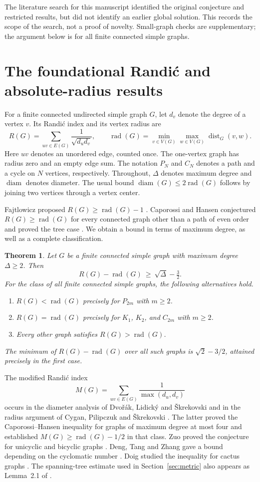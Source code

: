 \documentclass[11pt,a4paper]{article}
\newtheorem{theorem}{Theorem}[section]
\newcommand{\rad}{\operatorname{rad}}
\newcommand{\diam}{\operatorname{diam}}
\newcommand{\dist}{\operatorname{dist}}
\begin{document}
The literature search for this manuscript identified the original
conjecture and restricted results, but did not identify an earlier
global solution. This records the scope of the search, not a proof
of novelty. Small-graph checks are supplementary; the argument below
is for all finite connected simple graphs.

\section{The foundational Randi\'c and absolute-radius results}
For a finite connected undirected simple graph $G$, let $d_v$ denote the
degree of a vertex $v$. Its Randi\'c index and its vertex radius are
\[
 R(G)=\sum_{uv\in E(G)}\frac{1}{\sqrt{d_ud_v}},\qquad
 \rad(G)=\min_{v\in V(G)}\max_{w\in V(G)}\dist_G(v,w).
\]
Here $uv$ denotes an unordered edge, counted once. The one-vertex graph
has radius zero and an empty edge sum. The notation $P_N$ and $C_N$
denotes a path and a cycle on $N$ vertices, respectively. Throughout,
$\Delta$ denotes maximum degree and $\diam$ denotes diameter. The usual
bound $\diam(G)\le2\rad(G)$ follows by joining two vertices through a
vertex center.

Fajtlowicz proposed $R(G)\ge\rad(G)-1$ \cite{Faj}. Caporossi and Hansen
conjectured $R(G)\ge\rad(G)$ for every connected graph other than a
path of even order and proved the tree case \cite{CH,Zuo}. We obtain a
bound in terms of maximum degree, as well as a complete classification.
\begin{theorem}\label{thm:main}
Let $G$ be a finite connected simple graph with maximum degree $\Delta\ge2$.
Then
\begin{equation}\label{eq:main}
 R(G)-\rad(G)\ \ge\ \sqrt{\Delta}-\tfrac32.
\end{equation}
For the class of all finite connected simple graphs, the following alternatives hold.
\begin{enumerate}
\item $R(G)<\rad(G)$ precisely for $P_{2m}$ with $m\ge2$.
\item $R(G)=\rad(G)$ precisely for $K_1$, $K_2$, and $C_{2m}$ with $m\ge2$.
\item Every other graph satisfies $R(G)>\rad(G)$.
\end{enumerate}
The minimum of $R(G)-\rad(G)$ over all such graphs is $\sqrt2-3/2$,
attained precisely in the first case.
\end{theorem}

The modified Randi\'c index
\[
 M(G)=\sum_{uv\in E(G)}\frac1{\max(d_u,d_v)}
\]
occurs in the diameter analysis of Dvo\v{r}\'ak, Lidick\'y and
\v{S}krekovski \cite{DLS} and in the radius argument of Cygan, Pilipczuk
and \v{S}krekovski \cite{CPS}. The latter proved the Caporossi--Hansen
inequality for graphs of maximum degree at most four and established
$M(G)\ge\rad(G)-1/2$ in that class. Zuo proved the conjecture for
unicyclic and bicyclic graphs \cite{Zuo}. Deng, Tang and Zhang gave a
bound depending on the cyclomatic number \cite{Deng}. Doig studied the
inequality for cactus graphs \cite{Doig}. The spanning-tree estimate used
in Section~\ref{sec:metric} also appears as Lemma~2.1 of \cite{CPS}.
\end{document}
